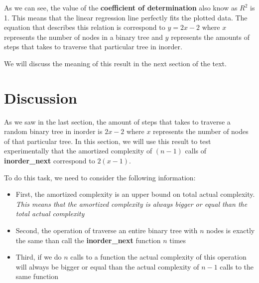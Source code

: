 \documentclass[12p]{report}
\begin{document}
As we can see, the value of the \textbf{coefficient of determination} also know as $R^2$ is 1. This means that the linear regression line perfectly fits the plotted data. The equation that describes this relation is correspond to $y=2x-2$ where $x$ represents the number of nodes in a binary tree and $y$ represents the amounts of steps that takes to traverse that particular tree in inorder.

\bigskip

We will discuss the meaning of this result in the next section of the text.


  \section{Discussion}

As we saw in the last section, the amount of steps that takes to traverse a random binary tree in inorder is $2x-2$ where $x$ represents the number of nodes of that particular tree. In this section, we will use this result to test experimentally that the amortized complexity of $(n-1)$ calls of \textbf{inorder\_next} correspond to $2(x-1)$.

\bigskip

To do this task, we need to consider the following information:
\begin{itemize}
  \item First, the amortized complexity is an upper bound on total actual complexity. \textit{This means that the amortized complexity is always bigger or equal than the total actual complexity}
  \item Second, the operation of traverse an entire binary tree with $n$ nodes is exactly the same than call the \textbf{inorder\_next} function $n$ times
  \item Third, if we do $n$ calls to a function the actual complexity of this operation will always be bigger or equal than the actual complexity of $n-1$ calls to the same function
\end{itemize}

\bigskip
\bigskip
\end{document}
